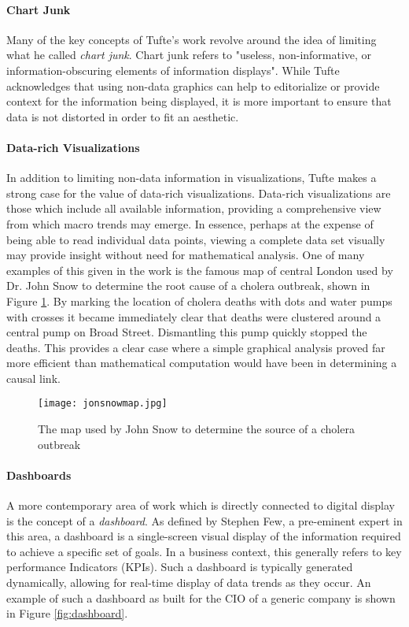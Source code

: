 \paragraph{Chart Junk}
Many of the key concepts of Tufte's work revolve around the idea of limiting what he called \emph{chart junk}. Chart junk refers to "useless, non-informative, or information-obscuring elements of information displays"\cite{Tufle1983}. While Tufte acknowledges that using non-data graphics can help to editorialize or provide context for the information being displayed,  it is more important to ensure that data is not distorted in order to fit an aesthetic. 

\paragraph{Data-rich Visualizations}
In addition to limiting non-data information in visualizations, Tufte makes a strong case for the value of data-rich visualizations. Data-rich visualizations are those which include all available information, providing a comprehensive view from which macro trends may emerge. In essence, perhaps at the expense of being able to read individual data points, viewing a complete data set visually may provide insight without need for mathematical analysis. One of many examples of this given in the work is the famous map of central London used by Dr. John Snow to determine the root cause of a cholera outbreak, shown in Figure \ref{fig:snowmap}. By marking the location of cholera deaths with dots and water pumps with crosses it became immediately clear that deaths were clustered around a central pump on Broad Street. Dismantling this pump quickly stopped the deaths. This provides a clear case where a simple graphical analysis proved far more efficient than mathematical computation would have been in determining a causal link.

\begin{figure}
	\centering
	\texttt{[image: jonsnowmap.jpg]}
	\caption{The map used by John Snow to determine the source of a cholera outbreak \cite{Tufle1983}}
		\label{fig:snowmap}
\end{figure}

\paragraph{Dashboards}
A more contemporary area of work which is directly connected to digital display is the concept of a \emph{dashboard}. As defined by Stephen Few, a pre-eminent expert in this area, a dashboard is a single-screen visual display of the information required to achieve a specific set of goals. In a business context, this generally refers to key performance Indicators (KPIs). Such a dashboard is typically generated dynamically, allowing for real-time display of data trends as they occur. An example of such a dashboard as built for the CIO of a generic company is shown in Figure \ref{fig:dashboard}. 

